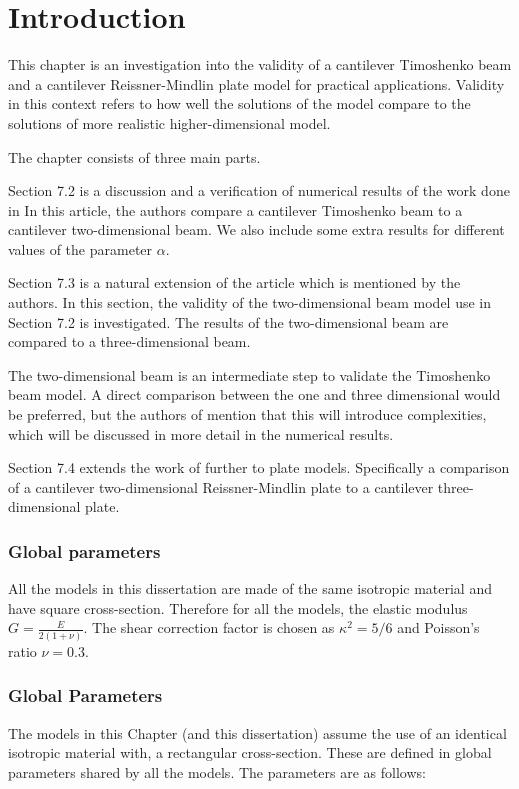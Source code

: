 \documentclass[../../main.tex]{subfiles}
\begin{document}
\section{Introduction}
This chapter is an investigation into the validity of a cantilever Timoshenko beam and a cantilever Reissner-Mindlin plate model for practical applications. Validity in this context refers to how well the solutions of the model compare to the solutions of more realistic higher-dimensional model.

The chapter consists of three main parts.

Section 7.2 is a discussion and a verification of numerical results of the work done in \cite{LVV09} In this article, the authors compare a cantilever Timoshenko beam to a cantilever two-dimensional beam. We also include some extra results for different values of the parameter $\alpha$.

Section 7.3 is a natural extension of the article \cite{LVV09} which is mentioned by the authors. In this section, the validity of the two-dimensional beam model use in Section 7.2 is investigated. The results of the two-dimensional beam are compared to a three-dimensional beam. 

The two-dimensional beam is an intermediate step to validate the Timoshenko beam model. A direct comparison between the one and three dimensional would be preferred, but the authors of \cite{LVV09} mention that this will introduce complexities, which will be discussed in more detail in the numerical results.

Section 7.4 extends the work of \cite{LVV09} further to plate models. Specifically a comparison of a cantilever two-dimensional Reissner-Mindlin plate to a cantilever three-dimensional plate. 

\subsubsection{Global parameters}
All the models in this dissertation are made of the same isotropic material and have square cross-section. Therefore for all the models, the elastic modulus $\displaystyle G = \frac{E}{2(1+\nu)}$. The shear correction factor is chosen as $\kappa^2 = 5/6$ and Poisson's ratio $\nu = 0.3$.\\


\subsubsection{Global Parameters}
The models in this Chapter (and this dissertation) assume the use of an identical isotropic material with, a rectangular cross-section. These are defined in global parameters shared by all the models. The parameters are as follows:
\end{document}

